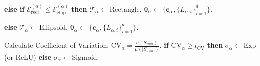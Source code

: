 \documentclass{article}
\newcommand{\red}[1]{\textcolor{red}{#1}}
\theoremstyle{plain}
\theoremstyle{definition}
\begin{document}
{\begin{algorithm}[H]
\begin{algorithmic}[1]
    \STATE \textbf{else if} $\mathcal{E}_{\mathrm{rect}}^{(\alpha)} \le \mathcal{E}_{\mathrm{ellip}}^{(\alpha)}$ \textbf{then}  $\mathcal{T}_\alpha \gets \text{Rectangle}$, $\boldsymbol{\theta}_\alpha \gets \{ \boldsymbol{c}_\alpha, \{L_{\alpha,i}\}_{i=1}^d \}$.
    

    \STATE \textbf{else} $\mathcal{T}_\alpha \gets \text{Ellipsoid}$, $\boldsymbol{\theta}_\alpha \gets \{ \boldsymbol{c}_\alpha, \{L_{\alpha,i}\}_{i=1}^d \}$.
    
    \STATE Calculate Coefficient of Variation: $\text{CV}_\alpha = \frac{\sigma(S_{\text{num}})}{ \mu(|S_{\text{num}}|)} $.
    \STATE \textbf{if} $\text{CV}_\alpha \ge t_{\text{CV}}$ \textbf{then} $\sigma_\alpha \gets \text{Exp}$ (or ReLU) \textbf{else} $\sigma_\alpha \gets \text{Sigmoid}$.
    

\end{algorithmic}
\end{algorithm}}
\end{document}
